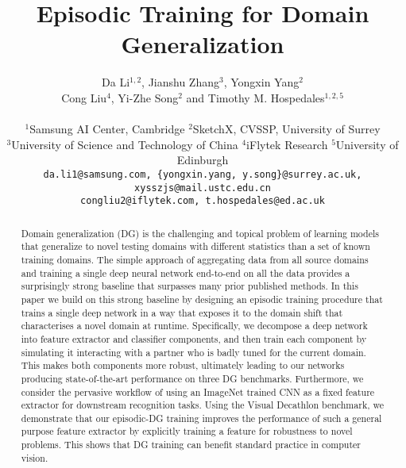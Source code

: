 \documentclass[10pt,twocolumn,letterpaper]{article}
\begin{document}
\title{Episodic Training for Domain Generalization}

\author{Da Li$^{1,2}$, Jianshu Zhang$^{3}$, Yongxin Yang$^{2}$ \\
Cong Liu$^4$, Yi-Zhe Song$^2$ and Timothy M. Hospedales$^{1,2,5}$\\
\\
$^1$Samsung AI Center, Cambridge \quad
$^2$SketchX, CVSSP, University of Surrey \\
$^3$University of Science and Technology of China \quad
$^4$iFlytek Research \quad
$^5$University of Edinburgh \\
{\tt\small da.li1@samsung.com, \{yongxin.yang, y.song\}@surrey.ac.uk, xysszjs@mail.ustc.edu.cn} \\
{\tt\small congliu2@iflytek.com, t.hospedales@ed.ac.uk} 
}

\maketitle



\begin{abstract}
Domain generalization (DG) is the challenging and topical problem of learning models that generalize to novel testing domains with different statistics than a set of known training domains. The simple approach of aggregating data from all source domains and training a single deep neural network end-to-end on all the data provides a surprisingly strong baseline that surpasses many prior published methods. In this paper we build on this strong baseline by designing an episodic training procedure that trains a single deep network in a way that exposes it to the domain shift that characterises a novel domain at runtime. Specifically, we decompose a deep network into feature extractor and classifier components, and then train each component by simulating it interacting with a partner who is badly tuned for the current domain. This makes both components more robust, ultimately leading to our networks producing state-of-the-art performance on three DG benchmarks. Furthermore, we consider the pervasive workflow of using an ImageNet trained CNN as a fixed feature extractor for downstream recognition tasks. Using the Visual Decathlon benchmark, we demonstrate that our episodic-DG training improves the performance of such a general purpose feature extractor by explicitly training a feature for robustness to novel problems. This shows that DG training can benefit standard practice in computer vision.
\end{abstract}
\end{document}
